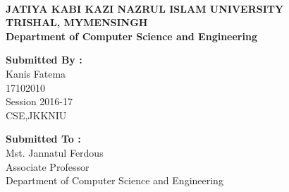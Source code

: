 \documentclass[a4paper,10pt]{article}
\begin{document}
	\begin{center}
		
		\vspace{5mm}
		
		
		
		\textbf{{	\\JATIYA KABI KAZI NAZRUL ISLAM UNIVERSITY }} \\
		\vspace{2mm}
		\textbf{ TRISHAL, MYMENSINGH} \\
		\vspace{2mm}
		\textbf{{Department of Computer Science and Engineering}} \\
		
		
		
	\end{center}
	\vspace{25mm}
	\textbf{{\large Submitted By :}}
	\\Kanis Fatema \\ 17102010\\Session 2016-17\\CSE,JKKNIU\\
	\vspace{20mm}
	\begin{flushright}
		\textbf{{\large Submitted To :}}\\ 
		{Mst. Jannatul Ferdous  \\ Associate Professor\\Department of Computer Science and Engineering }\\
	\end{flushright}
	\vspace{25mm}
	
	
\end{document}

